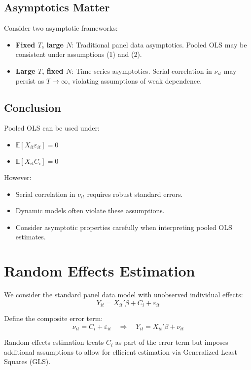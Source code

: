 \documentclass[12pt, oneside]{article}
\begin{document}
\subsection*{Asymptotics Matter}

Consider two asymptotic frameworks:

\begin{itemize}
    \item \textbf{Fixed \( T \), large \( N \)}: Traditional panel data asymptotics. Pooled OLS may be consistent under assumptions (1) and (2).
    \item \textbf{Large \( T \), fixed \( N \)}: Time-series asymptotics. Serial correlation in \( \nu_{it} \) may persist as \( T \to \infty \), violating assumptions of weak dependence.
\end{itemize}

\subsection*{Conclusion}

Pooled OLS can be used under:
\begin{itemize}
    \item \( \mathbb{E}[X_{it} \varepsilon_{it}] = 0 \)
    \item \( \mathbb{E}[X_{it} C_i] = 0 \)
\end{itemize}

However:
\begin{itemize}
    \item Serial correlation in \( \nu_{it} \) requires robust standard errors.
    \item Dynamic models often violate these assumptions.
    \item Consider asymptotic properties carefully when interpreting pooled OLS estimates.
\end{itemize}

\section*{Random Effects Estimation}

We consider the standard panel data model with unobserved individual effects:
\[
Y_{it} = X_{it}' \beta + C_i + \varepsilon_{it}
\]

Define the composite error term:
\[
\nu_{it} = C_i + \varepsilon_{it} \quad \Rightarrow \quad Y_{it} = X_{it}' \beta + \nu_{it}
\]

Random effects estimation treats \( C_i \) as part of the error term but imposes additional assumptions to allow for efficient estimation via Generalized Least Squares (GLS).
\end{document}
